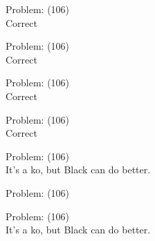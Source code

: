 \documentclass[11pt]{article}
\begin{document}
\begin{minipage}[t]{0.5\textwidth}
  {\centering
  
Problem: (106)\\
Correct\\
  }
\end{minipage}
\begin{minipage}[t]{0.5\textwidth}
  {\centering
  
Problem: (106)\\
Correct\\
  }
\end{minipage}
\begin{minipage}[t]{0.5\textwidth}
  {\centering
  
Problem: (106)\\
Correct\\
  }
\end{minipage}
\begin{minipage}[t]{0.5\textwidth}
  {\centering
  
Problem: (106)\\
Correct\\
  }
\end{minipage}
\begin{minipage}[t]{0.5\textwidth}
  {\centering
  
Problem: (106)\\
It's a ko, but Black can do better.\\
  }
\end{minipage}
\begin{minipage}[t]{0.5\textwidth}
  {\centering
  
Problem: (106)\\
  }
\end{minipage}
\begin{minipage}[t]{0.5\textwidth}
  {\centering
  
Problem: (106)\\
It's a ko, but Black can do better.\\
  }
\end{minipage}
\end{document}
